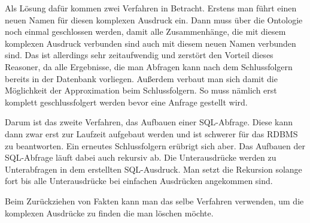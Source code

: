 Als Lösung dafür kommen zwei Verfahren in Betracht. Erstens man führt einen neuen Namen für diesen komplexen Ausdruck ein. Dann muss über die Ontologie noch einmal geschlossen werden, damit alle Zusammenhänge, die mit diesem komplexen Ausdruck verbunden sind auch mit diesem neuen Namen verbunden sind. Das ist allerdings sehr zeitaufwendig und zerstört den Vorteil dieses Reasoner, da alle Ergebnisse, die man Abfragen kann nach dem Schlussfolgern bereits in der Datenbank vorliegen. Außerdem verbaut man sich damit die Möglichkeit der Approximation beim Schlussfolgern. So muss nämlich erst komplett geschlussfolgert werden bevor eine Anfrage gestellt wird.

Darum ist das zweite Verfahren, das Aufbauen einer SQL-Abfrage. Diese kann dann zwar erst zur Laufzeit aufgebaut werden und ist schwerer für das RDBMS zu beantworten. Ein erneutes Schlussfolgern erübrigt sich aber. Das Aufbauen der SQL-Abfrage läuft dabei auch rekursiv ab. Die Unterausdrücke werden zu Unterabfragen in dem erstellten SQL-Ausdruck. Man setzt die Rekursion solange fort bis alle Unterausdrücke bei einfachen Ausdrücken angekommen sind.

Beim Zurückziehen von Fakten kann man das selbe Verfahren verwenden, um die komplexen Ausdrücke zu finden die man löschen möchte.